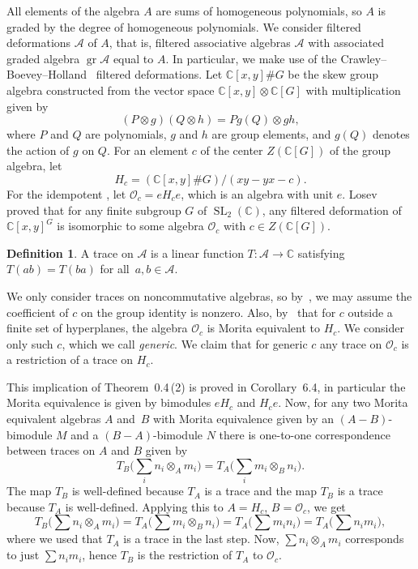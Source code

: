 \documentclass[pdftex]{sigma}
\newcommand\CC{\mathbb{C}}
\newcommand\cA{\mathcal{A}}
\newcommand\cO{\mathcal{O}}
\DeclareMathOperator\gr{gr}
\DeclareMathOperator\SL{SL}
\numberwithin{equation}{section}
\theoremstyle{definition}
\newtheorem{Definition}[Theorem]{Definition}
\begin{document}
All elements of the algebra $A$ are sums of homogeneous polynomials,
so $A$ is graded by the degree of homogeneous polynomials.
We consider filtered deformations
$\cA$ of $A$, that is, filtered associative algebras $\cA$
with associated graded algebra $\gr \cA$ equal to $A$.
In particular, we make use of the Crawley--Boevey--Holland~\cite{cbh}
filtered deformations.
Let $\CC[x, y] \# G$ be the skew group algebra
constructed from the vector space $\CC[x, y] \otimes \CC[G]$
with multiplication given by
\begin{equation*}
 (P \otimes g)(Q \otimes h) = Pg(Q) \otimes gh,
\end{equation*}
where $P$ and $Q$ are polynomials, $g$ and $h$ are group elements,
and $g(Q)$ denotes the action of $g$ on $Q$.
For an element $c$ of the center $Z(\CC[G])$ of the group algebra, let
\begin{equation*}
 H_c = (\CC[x, y] \# G)/(xy - yx - c).
\end{equation*}
For the idempotent ,
let $\cO_c = eH_ce$, which is an algebra with unit $e$.
Losev~\cite[Theorem~3.4]{losev2022deformations}
proved that
for any finite subgroup $G$ of $\SL_2(\CC)$,
any filtered deformation of~$\CC[x, y]^G$
is isomorphic to some algebra $\cO_c$
with $c \in Z(\CC[G])$.

\begin{Definition}
 A trace on $\cA$ is a linear function $T \colon \cA \rightarrow \CC$
 satisfying $T(ab) = T(ba)$ for all~${a, b \in \cA}$.
\end{Definition}

We only consider traces on noncommutative algebras,
so by~\cite[Theorem~0.4\,(1)]{cbh},
we may assume the coefficient of $c$ on the group identity is nonzero.
Also, by~\cite[Theorem~0.4\,(2)]{cbh} that
for $c$ outside a finite set of hyperplanes, the algebra $\cO_c$ is Morita equivalent to $H_c$. We consider only such $c$, which we call \emph{generic}. We claim that for generic $c$ any trace on $\cO_c$ is a restriction of
a trace on $H_c$.

This implication of Theorem~0.4\,(2) is proved in Corollary~6.4, in particular the Morita equivalence is given by bimodules $eH_c$ and $H_ce$. Now, for any two Morita equivalent algebras $A$ and~$B$ with Morita equivalence given by an $(A-B)$-bimodule $M$ and a $(B-A)$-bimodule $N$ there is one-to-one correspondence between traces on $A$ and $B$ given by
\[
T_B\bigg(\sum_i n_i\otimes_A m_i\bigg)=T_A\bigg(\sum_i m_i\otimes_B n_i\bigg).
\]
 The map $T_B$ is well-defined because $T_A$ is a trace and the map $T_B$ is a trace because $T_A$ is well-defined. Applying this to $A=H_c$, $B=\cO_c$, we get
 \[
 T_B\bigg(\sum n_i\otimes_A m_i\bigg)=T_A\bigg(\sum m_i\otimes_B n_i\bigg)=T_A\bigg(\sum m_in_i\bigg)=T_A\bigg(\sum n_im_i\bigg),
 \]
 where we used that $T_A$ is a trace in the last step. Now, $\sum n_i\otimes_A m_i$ corresponds to just $\sum n_im_i$, hence $T_B$ is the restriction of $T_A$ to $\cO_c$.
\end{document}

